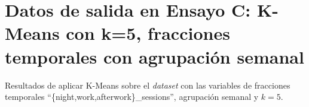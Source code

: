 \chapter{Datos de salida en Ensayo C: K-Means con k=5, fracciones temporales con agrupación semanal}\label{app:ensayoC}

Resultados de aplicar K-Means sobre el \emph{dataset} con las variables de fracciones temporales ``\{night,work,afterwork\}\_sessions'', agrupación semanal y $k=5$.


